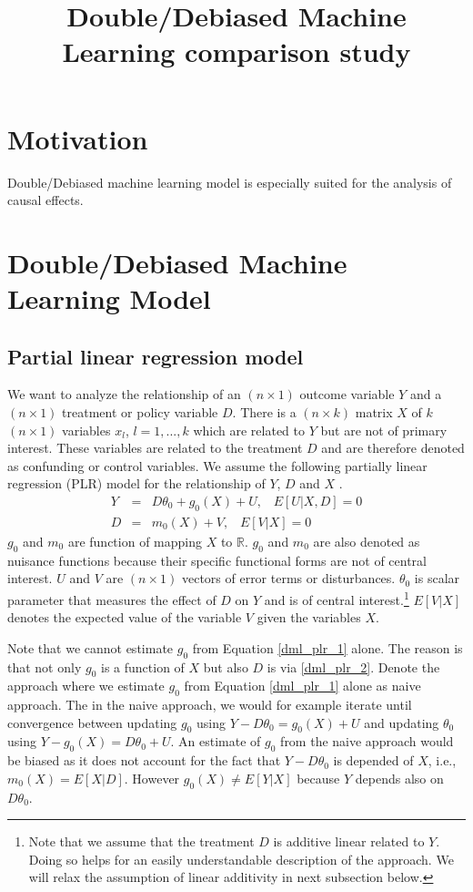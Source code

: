 \documentclass[10pt]{article}
\title{Double/Debiased Machine Learning comparison study}
\begin{document}
\maketitle
{}
\section{Motivation}
Double/Debiased machine learning model is especially suited for the analysis of causal effects.

\section{Double/Debiased Machine Learning Model}
\subsection{Partial linear regression model}
We want to analyze the relationship of an $(n \times 1 )$ outcome variable $Y$ and a $(n \times 1 )$ treatment or policy variable $D$. 
There is a $(n \times k )$ matrix $X$ of $k$ $(n \times 1 )$ variables $x_l$, $l=1,...,k$ which are related to $Y$ but are not of primary interest.
These variables are related to the treatment $D$ and are therefore denoted as confunding or control variables.
We assume the following partially linear regression (PLR) model for the relationship of $Y$, $D$ and $X$ \cite{Cher2018}.
\begin{eqnarray}\label{dml_plr_1}
Y &=& D \theta_0 + g_0(X) + U, \;\;\; E[U|X,D] =0  	\\ \label{dml_plr_2}
D &=&  m_0(X) + V, \;\;\; E[V|X] =0  	
\end{eqnarray}
$g_0$ and $m_0$ are function of mapping $X$ to $\mathbb{R}$. 
$g_0$ and $m_0$ are also denoted as nuisance functions because their specific functional forms are not of central interest.
$U$ and $V$ are $(n \times 1 )$ vectors of error terms or disturbances. 
$\theta_0$ is scalar parameter that measures the effect of $D$ on $Y$ and is of central interest.\footnote{
Note that we assume that the treatment $D$ is additive linear related to $Y$. 
Doing so helps for an easily understandable description of the approach.
We will relax the assumption of linear additivity in next subsection below.}
$ E[V|X]$ denotes the expected value of the variable $V$ given the variables $X$.
	
Note that we cannot estimate $g_0$ from Equation \eqref{dml_plr_1} alone. 
The reason is that not only $g_0$ is a function of $X$ but also $D$ is via \eqref{dml_plr_2}. 
Denote the approach where we estimate $g_0$ from Equation \eqref{dml_plr_1} alone as naive approach.
The in the naive approach, we would for example iterate until convergence between updating $g_0$ using $Y - D \theta_0 = g_0(X) + U$ and updating $\theta_0$ using $Y - g_0(X) = D \theta_0 + U$. 
An estimate of $g_0$ from the naive approach would be biased as it does not account for the fact that $Y - D \theta_0$ is depended of $X$, i.e., $ m_0(X) = E[X|D] $.
However $ g_0(X) \ne E[Y|X] $ because $Y$ depends also on $D \theta_0$.
\end{document}
